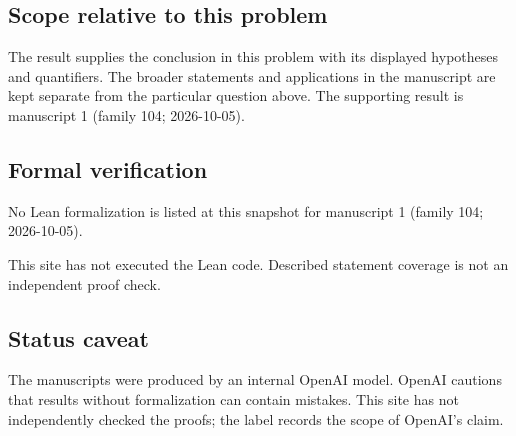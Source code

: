 \documentclass[11pt]{article}
\begin{document}
\subsection{Scope relative to this problem}
The result supplies the conclusion in this problem with its displayed hypotheses and quantifiers. The broader statements and applications in the manuscript are kept separate from the particular question above. The supporting result is manuscript 1 (family 104; 2026-10-05).

\subsection{Formal verification}
No Lean formalization is listed at this snapshot for manuscript 1 (family 104; 2026-10-05).

This site has not executed the Lean code. Described statement coverage is not an independent proof check.

\subsection{Status caveat}
The manuscripts were produced by an internal OpenAI model. OpenAI cautions that results without formalization can contain mistakes. This site has not independently checked the proofs; the label records the scope of OpenAI's claim.
\end{document}
